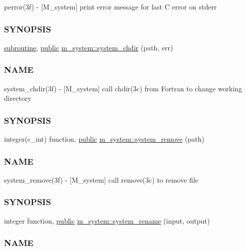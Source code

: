 \begin{DoxyCompactItemize}
\begin{DoxyCompactList}
perror(3f) -\/ \mbox{[}M\+\_\+system\mbox{]} print error message for last C error on stderr \subsubsection*{S\+Y\+N\+O\+P\+S\+IS}\end{DoxyCompactList}\item 
\hyperlink{M__stopwatch_83_8txt_acfbcff50169d691ff02d4a123ed70482}{subroutine}, \hyperlink{M__stopwatch_83_8txt_a2f74811300c361e53b430611a7d1769f}{public} \hyperlink{namespacem__system_a47746b670cb21bae0957c9bb2bccf209}{m\+\_\+system\+::system\+\_\+chdir} (path, err)
\begin{DoxyCompactList}\small\item\em \subsubsection*{N\+A\+ME}

system\+\_\+chdir(3f) -\/ \mbox{[}M\+\_\+system\mbox{]} call chdir(3c) from Fortran to change working directory \subsubsection*{S\+Y\+N\+O\+P\+S\+IS}\end{DoxyCompactList}\item 
integer(c\+\_\+int) function, \hyperlink{M__stopwatch_83_8txt_a2f74811300c361e53b430611a7d1769f}{public} \hyperlink{namespacem__system_a730ae64294e3cd73bde8f0c63cdf9972}{m\+\_\+system\+::system\+\_\+remove} (path)
\begin{DoxyCompactList}\small\item\em \subsubsection*{N\+A\+ME}

system\+\_\+remove(3f) -\/ \mbox{[}M\+\_\+system\mbox{]} call remove(3c) to remove file \subsubsection*{S\+Y\+N\+O\+P\+S\+IS}\end{DoxyCompactList}\item 
integer function, \hyperlink{M__stopwatch_83_8txt_a2f74811300c361e53b430611a7d1769f}{public} \hyperlink{namespacem__system_adfbaf3d17790da9ba0c520683d5b8003}{m\+\_\+system\+::system\+\_\+rename} (input, output)
\begin{DoxyCompactList}\small\item\em \subsubsection*{N\+A\+ME}


\end{DoxyCompactList}
\end{DoxyCompactItemize}
